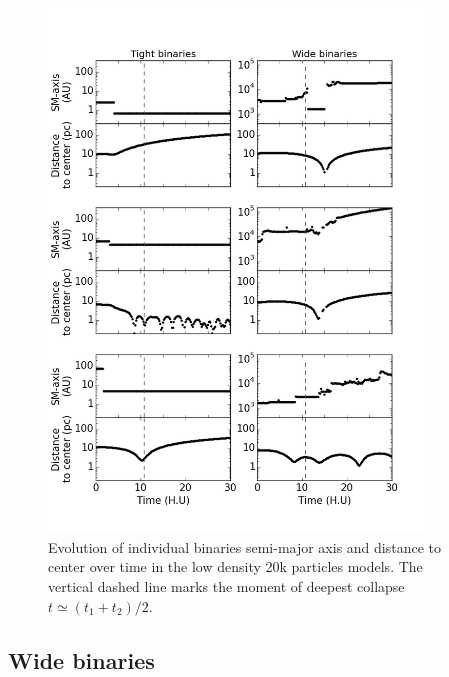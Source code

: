 	
\begin{figure}
\begin{center}
\includegraphics[width=0.9\textwidth]{Figures/6_adventures}
\caption{ Evolution of individual binaries semi-major axis and distance to center over time in the low density 20k particles models. The vertical dashed line marks the moment of deepest collapse $t \simeq (t_1 + t_2) / 2$. }
\label{Fig:6_adventures}
\end{center}
\end{figure}


\subsection{Wide binaries}



